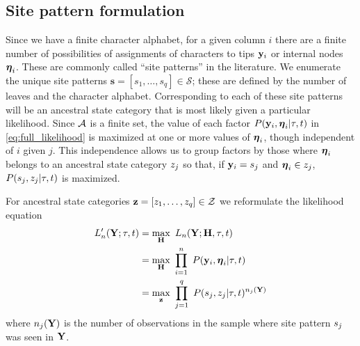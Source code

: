 \documentclass[a4paper]{article}
\begin{document}
\subsection{Site pattern formulation}

Since we have a finite character alphabet, for a given column $i$ there are a finite number of possibilities of assignments of characters to tips $\mathbf{y}_i$ or internal nodes $\boldsymbol\eta_i$.
These are commonly called ``site patterns'' in the literature.
We enumerate the unique site patterns $\mathbf{s}=[s_1,\ldots,s_q]\in\mathcal{S}$; these are defined by the number of leaves and the character alphabet.
Corresponding to each of these site patterns will be an ancestral state category that is most likely given a particular likelihood.
Since $\mathcal{A}$ is a finite set, the value of each factor $P(\mathbf{y}_i, \boldsymbol\eta_i | \tau, t)$ in \eqref{eq:full_likelihood} is maximized at one or more values of $\boldsymbol\eta_i$, though independent of $i$ given $j$.
This independence allows us to group factors by those where $\boldsymbol\eta_i$ belongs to an ancestral state category $z_j$ so that, if $\mathbf{y}_i=s_j$ and $\boldsymbol\eta_i\in z_j$, $P(s_j, z_j | \tau, t)$ is maximized.

For ancestral state categories $\mathbf{z}=[z_1,\ldots,z_q]\in\mathcal{Z}$ we reformulate the likelihood equation
\begin{align}
L_n'(\mathbf{Y};\tau, t) &= \max_{\mathbf{H}} \ L_n(\mathbf{Y};\mathbf{H}, \tau, t) \\
                             &= \max_{\mathbf{H}} \ \prod_{i=1}^{n} \ P(\mathbf{y}_i, \boldsymbol\eta_i | \tau, t) \\
                             &= \max_{\mathbf{z}} \ \prod_{j=1}^{q} \ P(s_j, z_j | \tau, t)^{n_j(\mathbf{Y})} \label{eq:site_pattern_likelihood}
\end{align}
where $n_j(\mathbf{Y})$ is the number of observations in the sample where site pattern $s_j$ was seen in $\mathbf{Y}$.
\end{document}
